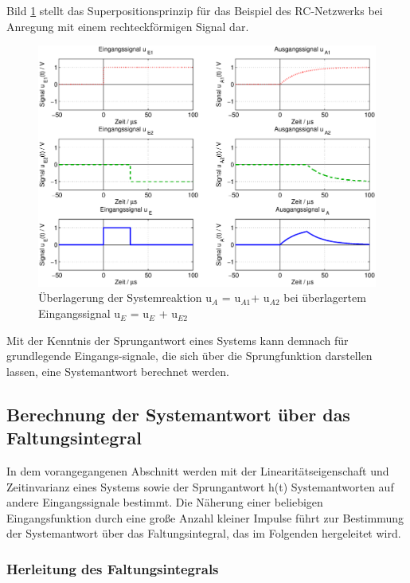\noindent Bild \ref{fig:RCEinschwingenRechteck} stellt das Superpositionsprinzip für das Beispiel des RC-Netzwerks bei Anregung mit einem rechteckförmigen Signal dar.

\begin{figure}[H]
  \centerline{\includegraphics[width=1\textwidth]{Kapitel2/Bilder/image17}}
  \caption{Überlagerung der Systemreaktion u${}_{A}$ = u${}_{A1}$+ u${}_{A2}$ bei überlagertem Eingangssignal u${}_{E}$ = u${}_{E}$ + u${}_{E2}$}
  \label{fig:RCEinschwingenRechteck}
\end{figure}

\noindent Mit der Kenntnis der Sprungantwort eines Systems kann demnach für grundlegende Eingangs-signale, die sich über die Sprungfunktion darstellen lassen, eine Systemantwort berechnet werden. 

\subsection{Berechnung der Systemantwort über das Faltungsintegral}

\noindent In dem vorangegangenen Abschnitt werden mit der Linearitätseigenschaft und Zeitinvarianz eines Systems sowie der Sprungantwort h(t) Systemantworten auf andere Eingangssignale bestimmt. Die Näherung einer beliebigen Eingangsfunktion durch eine große Anzahl kleiner Impulse führt zur Bestimmung der Systemantwort über das Faltungsintegral, das im Folgenden hergeleitet wird. 

\subsubsection{Herleitung des Faltungsintegrals}


